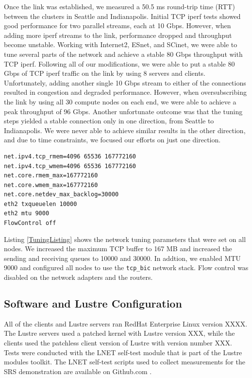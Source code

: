 \documentclass[]{sigplan-proc}
\begin{document}
Once the link was established, we measured a 50.5 ms round-trip time (RTT) between the clusters in Seattle and
Indianapolis. Initial TCP iperf tests showed good performance for two parallel streams, each at 10
Gbps. However, when adding more iperf streams to the link, performance dropped and throughput become
unstable. Working with Internet2, ESnet, and SCinet, we were able to tune several parts of the network and
achieve a stable 80 Gbps throughput with TCP iperf. Following all of our modifications, we were able to put a
stable 80 Gbps of TCP iperf traffic on the link by using 8 servers and clients. Unfortunately, adding another
single 10 Gbps stream to either of the connections resulted in congestion and degraded performance. However,
when oversubscribing the link by using all 30 compute nodes on each end, we were able to achieve a peak
throughput of 96 Gbps. Another unfortunate outcome was that the tuning steps yielded a stable connection only
in one direction, from Seattle to Indianapolis. We were never able to achieve similar results in the other
direction, and due to time constraints, we focused our efforts on just one direction.

\lstset{language=Bash, caption=Tuning parameters for the network, label=TuningListing}
\begin{lstlisting}
net.ipv4.tcp_rmem=4096 65536 167772160
net.ipv4.tcp_wmem=4096 65536 167772160
net.core.rmem_max=167772160
net.core.wmem_max=167772160
net.core.netdev_max_backlog=30000
eth2 txqueuelen 10000
eth2 mtu 9000
FlowControl off 
\end{lstlisting}

Listing \ref{TuningListing} shows the network tuning parameters that were set on all nodes. We increased the maximum TCP buffer to 167 MB and increased the sending and receiving queues to 10000 and 30000. In addtion, we enabled MTU 9000 and configured all nodes to use the \texttt{tcp\_bic} network stack. Flow control was disabled on the network adapters and the routers.

\subsection{Software and Lustre Configuration}

All of the clients and Lustre servers ran RedHat Enterprise Linux version XXXX. The Lustre servers used a
patched kernel with Lustre version XXX, while the clients used the patchless client version of Lustre with
version number XXX. Tests were conducted with the LNET self-test module that is part of the Lustre modules
toolkit. The LNET self-test scripts used to collect measurements for the SRS demonstration are available on
Github.com \cite{lstgithub2011}.
\end{document}
